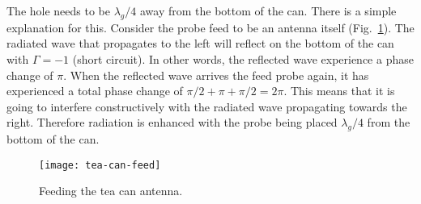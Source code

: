 \documentclass[letterpaper, 11pt]{article}
\begin{document}
The hole needs to be $\lambda_g/4$ away from the bottom of the can. There is a simple explanation for this. Consider the probe feed to be an antenna itself (Fig.~\ref{fig:tea-can-feed}). The radiated wave that propagates to the left will reflect on the bottom of the can with $\Gamma =-1$ (short circuit). In other words, the reflected wave experience a phase change of $\pi$. When the reflected wave arrives the feed probe again, it has experienced a total phase change of $\pi/2 + \pi + \pi/2 = 2 \pi$. This means that it is going to interfere constructively with the radiated wave propagating towards the right. Therefore radiation is enhanced with the probe being placed $\lambda_g/4$ from the bottom of the can. 

	\begin{figure}[ht]
		\centering	
		\texttt{[image: tea-can-feed]}
		\caption{Feeding the tea can antenna.}
		\label{fig:tea-can-feed}
	\end{figure}
\end{document}

